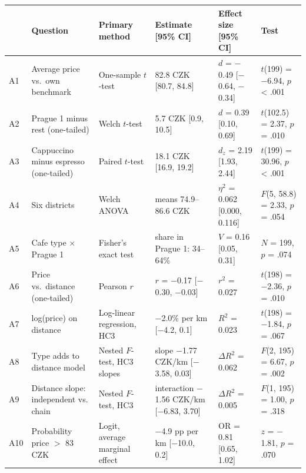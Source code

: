 \begin{tabular}{lp{2.6cm}p{2.6cm}p{3.0cm}p{2.6cm}p{3.0cm}}
  \toprule
 & Question & Primary method & Estimate [95\% CI] & Effect size [95\% CI] & Test \\ 
  \midrule
A1 & Average price vs.\ own benchmark & One-sample $t$-test & 82.8 CZK [80.7, 84.8] & $d$ = $-$0.49 [$-$0.64, $-$0.34] & $t$(199) = $-$6.94, $p$ < .001 \\ 
  A2 & Prague 1 minus rest (one-tailed) & Welch $t$-test & 5.7 CZK [0.9, 10.5] & $d$ = 0.39 [0.10, 0.69] & $t$(102.5) = 2.37, $p$ = .010 \\ 
  A3 & Cappuccino minus espresso (one-tailed) & Paired $t$-test & 18.1 CZK [16.9, 19.2] & $d_z$ = 2.19 [1.93, 2.44] & $t$(199) = 30.96, $p$ < .001 \\ 
  A4 & Six districts & Welch ANOVA & means 74.9--86.6 CZK & $\eta^2$ = 0.062 [0.000, 0.116] & $F$(5, 58.8) = 2.33, $p$ = .054 \\ 
  A5 & Cafe type $\times$ Prague 1 & Fisher's exact test & share in Prague 1: 34--64\% & $V$ = 0.16 [0.05, 0.31] & $N$ = 199, $p$ = .074 \\ 
  A6 & Price vs.\ distance (one-tailed) & Pearson $r$ & $r$ = $-$0.17 [$-$0.30, $-$0.03] & $r^2$ = 0.027 & $t$(198) = $-$2.36, $p$ = .010 \\ 
  A7 & log(price) on distance & Log-linear regression, HC3 & $-$2.0\% per km [$-$4.2, 0.1] & $R^2$ = 0.023 & $t$(198) = $-$1.84, $p$ = .067 \\ 
  A8 & Type adds to distance model & Nested $F$-test, HC3 slopes & slope $-$1.77 CZK/km [$-$3.58, 0.03] & $\Delta R^2$ = 0.062 & $F$(2, 195) = 6.67, $p$ = .002 \\ 
  A9 & Distance slope: independent vs. chain & Nested $F$-test, HC3 & interaction $-$1.56 CZK/km [$-$6.83, 3.70] & $\Delta R^2$ = 0.005 & $F$(1, 195) = 1.00, $p$ = .318 \\ 
  A10 & Probability price $>$ 83 CZK & Logit, average marginal effect & $-$4.9 pp per km [$-$10.0, 0.2] & OR = 0.81 [0.65, 1.02] & $z$ = $-$1.81, $p$ = .070 \\ 
   \bottomrule
\end{tabular}
